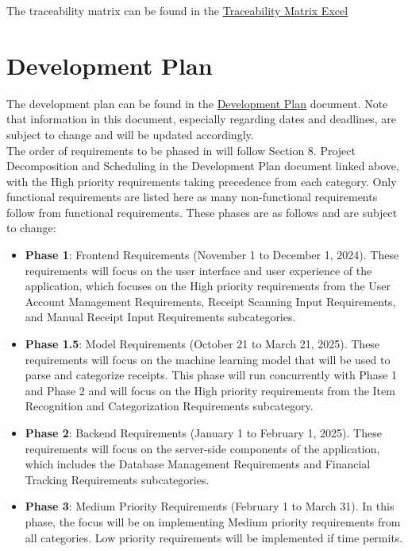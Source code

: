 \documentclass[12pt]{article}
\begin{document}
\noindent The traceability matrix can be found in the \href{https://github.com/PlutosCapstone/Plutos/blob/main/docs/SRS/traceability_matrix.xlsx}{Traceability Matrix Excel}

\newpage

\section{Development Plan}

The development plan can be found in the
\href{https://github.com/PlutosCapstone/Plutos/blob/main/docs/DevelopmentPlan/DevelopmentPlan.pdf}{Development
Plan} document. Note that information in this document, especially regarding dates and deadlines, are subject to change and will be updated accordingly. \\

The order of requirements to be phased in will follow Section 8. Project Decomposition and Scheduling in the Development Plan document linked above, with the High priority requirements taking precedence from each category. Only functional requirements are listed here as many non-functional requirements follow from functional requirements. These phases are as follows and are subject to change:
\begin{itemize}
  \item \textbf{Phase 1}: Frontend Requirements (November 1 to December 1,
  2024). These requirements will focus on the user interface and user experience
  of the application, which focuses on the High priority requirements from the
  User Account Management Requirements, Receipt Scanning Input Requirements, and
  Manual Receipt Input Requirements subcategories.
  \item \textbf{Phase 1.5}: Model Requirements (October 21 to March 21, 2025).
  These requirements will focus on the machine learning model that will be used
  to parse and categorize receipts. This phase will run concurrently with Phase
  1 and Phase 2 and will focus on the High priority requirements from the Item
  Recognition and Categorization Requirements subcategory.
  \item \textbf{Phase 2}: Backend Requirements (January 1 to February 1, 2025).
  These requirements will focus on the server-side components of the
  application, which includes the Database Management Requirements and Financial
  Tracking Requirements subcategories.
  \item \textbf{Phase 3}: Medium Priority Requirements (February 1 to March 31).
  In this phase, the focus will be on implementing Medium priority requirements
  from all categories. Low priority requirements will be implemented if time
  permits.
\end{itemize}
\end{document}

